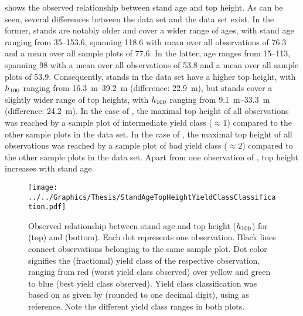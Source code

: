 shows the observed relationship between stand age and top height.  As can be seen, several differences between the \Beech{} data set and the \Spruce{} data set exist.  In the former, stands are notably older and cover a wider range of ages, with stand age ranging from \SIrange{35}{153.6}{\year}, spanning \SI{118.6}{\year} with mean over all observations of \SI{76.3}{\year} and a mean over all sample plots of \SI{77.6}{\year}.  In the latter, age ranges from \SIrange{15}{113}{\year}, spanning \SI{98}{\year} with a mean over all observations of \SI{53.8}{\year} and a mean over all sample plots of \SI{53.9}{\year}.  Consequently, stands in the \Beech{} data set have a higher top height, with \(h_{100}{}\) ranging from \SIrange{16.3}{39.2}{\meter} (difference: \SI{22.9}{\meter}), but \Spruce{} stands cover a slightly wider range of top heights, with \(h_{100}{}\) ranging from \SIrange{9.1}{33.3}{\meter} (difference: \SI{24.2}{\meter}).   In the case of \Beech{}, the maximal top height of all observations was reached by a sample plot of intermediate yield class (\(\approx{} 1\)) compared to the other sample plots in the data set.   In the case of \Spruce{}, the maximal top height of all observations was reached by a sample plot of bad yield class (\(\approx{} 2\)) compared to the other sample plots in the data set.  Apart from one observation of \Beech{}, top height increases with stand age.

\begin{figure}[t]
  \texttt{[image: ../../Graphics/Thesis/StandAgeTopHeightYieldClassClassification.pdf]}
  \caption{Observed relationship between stand age and top height (\(h_{100}{}\)) for \Beech{} (top) and \Spruce{} (bottom).  Each dot represents one observation.  Black lines connect observations belonging to the same sample plot.  Dot color signifies the (fractional) yield class of the respective observation, ranging from red (worst yield class observed) over yellow and green to blue (best yield class observed).  Yield class classification was based on \ProductivityIndexText{} as given by  (rounded to one decimal digit), using  as reference.  Note the different yield class ranges in both plots.}
  \label{fig:StandAgeTopHeightYieldClassClassification}
\end{figure}

